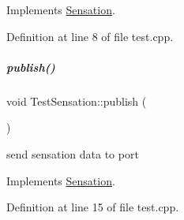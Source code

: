 Implements \hyperlink{group__sensationManager_a118f1c62b03a665c9f80496dcf3124f6}{Sensation}.



Definition at line 8 of file test.\+cpp.

\mbox{\label{group__sensationManager_ab97ecc34efb14126e76b70446a9d5866}} 
\subparagraph{\texorpdfstring{publish()}{publish()}}
{\footnotesize\ttfamily void Test\+Sensation\+::publish (\begin{DoxyParamCaption}{ }\end{DoxyParamCaption})\hspace{0.3cm}{\ttfamily [virtual]}}



send sensation data to port 



Implements \hyperlink{group__sensationManager_ad37c802d993694d36f6794e597b35c8c}{Sensation}.



Definition at line 15 of file test.\+cpp.

